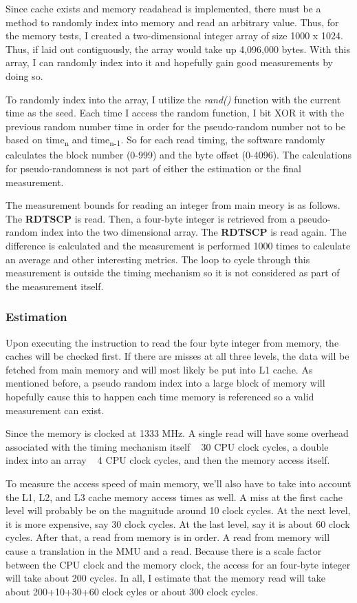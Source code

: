 \documentclass[paper=a4, fontsize=11pt]{scrartcl}
\numberwithin{equation}{section}        %
\numberwithin{figure}{section}          %
\numberwithin{table}{section}               %
\begin{document}
Since cache exists and memory readahead is implemented, there must be a method to randomly index into memory and read an arbitrary value.  Thus, for the memory tests, I created a two-dimensional integer array of size 1000 x 1024.  Thus, if laid out contiguously, the array would take up 4,096,000 bytes.  With this array, I can randomly index into it and hopefully gain good measurements by doing so.

To randomly index into the array, I utilize the \textit{rand()} function with the current time as the seed.  Each time I access the random function, I bit XOR it with the previous random number time in order for the pseudo-random number not to be based on time\textsubscript{n} and time\textsubscript{n-1}.  So for each read timing, the software randomly calculates the block number (0-999) and the byte offset (0-4096).  The calculations for pseudo-randomness is not part of either the estimation or the final measurement.

The measurement bounds for reading an integer from main meory is as follows.  The \textbf{RDTSCP} is read.  Then, a four-byte integer is retrieved from a pseudo-random index into the two dimensional array.  The \textbf{RDTSCP} is read again.  The difference is calculated and the measurement is performed 1000 times to calculate an average and other interesting metrics.  The loop to cycle through this measurement is outside the timing mechanism so it is not considered as part of the measurement itself.

\subsubsection{Estimation}

Upon executing the instruction to read the four byte integer from memory, the caches will be checked first.  If there are misses at all three levels, the data will be fetched from main memory and will most likely be put into L1 cache.  As mentioned before, a pseudo random index into a large block of memory will hopefully cause this to happen each time memory is referenced so a valid measurement can exist.

Since the memory is clocked at 1333 MHz.  A single read will have some overhead associated with the timing mechanism itself ~ 30 CPU clock cycles, a double index into an array ~ 4 CPU clock cycles, and then the memory access itself.

To measure the access speed of main memory, we'll also have to take into account the L1, L2, and L3 cache memory access times as well.  A miss at the first cache level will probably be on the magnitude around 10 clock cycles.  At the next level, it is more expensive, say 30 clock cycles.  At the last level, say it is about 60 clock cycles.  After that, a read from memory is in order.  A read from memory will cause a translation in the MMU and a read.  Because there is a scale factor between the CPU clock and the memory clock, the access for an four-byte integer will take about 200 cycles.  In all, I estimate that the memory read will take about 200+10+30+60 clock cyles or about 300 clock cycles.
\end{document}
